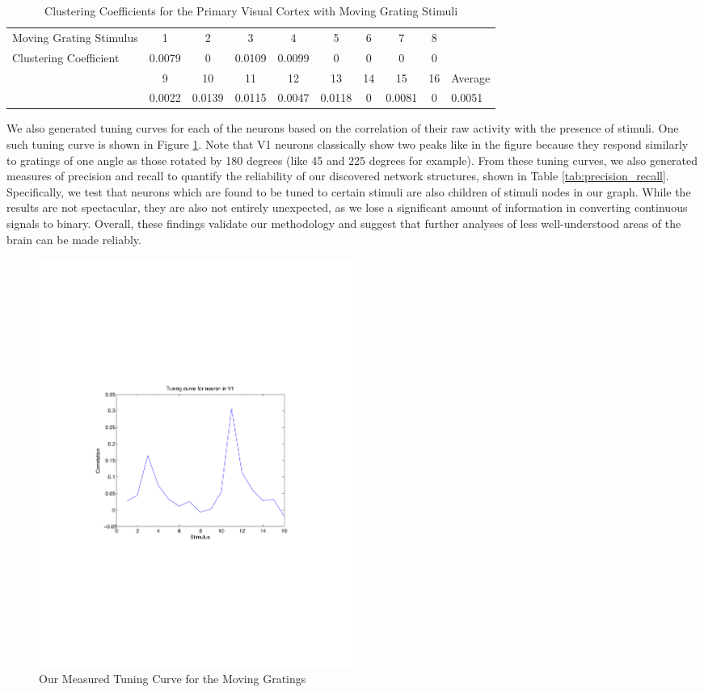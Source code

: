 \documentclass{article}
\begin{document}
\begin{table}[ht]
  \centering
  \footnotesize

  \begin{tabular}{l|c|c|c|c|c|c|c|c|l}
    \hline
    Moving Grating Stimulus & 1 & 2  & 3  & 4  & 5  & 6  & 7  & 8 \\
    Clustering Coefficient & 0.0079 & 0 & 0.0109 & 0.0099 & 0 & 0 & 0 & 0 \\
    \hline
                        & 9 & 10 & 11 & 12 & 13 & 14 & 15 & 16 & Average\\ 
     & 0.0022 & 0.0139 & 0.0115 & 0.0047 & 0.0118 & 0 & 0.0081 & 0 & 0.0051\\
    \hline
  \end{tabular}

  \caption{Clustering Coefficients for the Primary Visual Cortex with Moving Grating Stimuli}
  \label{tab:v1_clusters}
\end{table}

We also generated tuning curves for each of the neurons based on the 
correlation of their raw activity with the presence of stimuli. One such 
tuning curve is shown in Figure \ref{fig:v1_tuning}. Note that V1 neurons 
classically show two peaks like in the figure because they respond similarly 
to gratings of one angle as those rotated by 180 degrees (like 45 and 225 
degrees for example). From these tuning curves, we also generated measures of 
precision and recall to quantify the reliability of our discovered network 
structures, shown in Table \ref{tab:precision_recall}. Specifically, we test 
that neurons which are found to be tuned to certain stimuli are also children 
of stimuli nodes in our graph. While the results are not spectacular, they are 
also not entirely unexpected, as we lose a significant amount of information 
in converting continuous signals to binary. Overall, these findings validate 
our methodology and suggest that further analyses of less well-understood 
areas of the brain can be made reliably. \par

\begin{figure}[ht] 
  \centering
  
  \includegraphics[width=0.5\textwidth]{V1NeuronTuningCurve}
  \caption{Our Measured Tuning Curve for the Moving Gratings}
  \label{fig:v1_tuning}
\end{figure}
\end{document}
